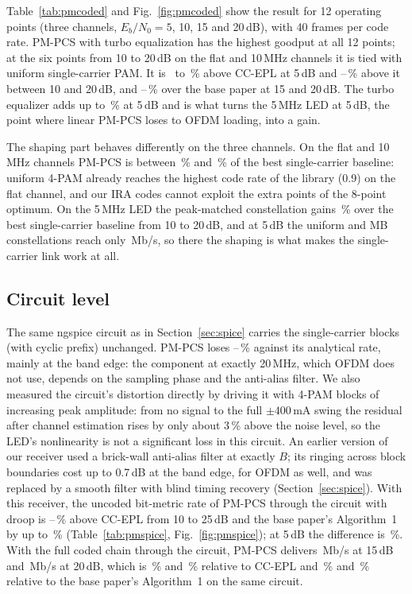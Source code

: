 \documentclass[conference]{IEEEtran}
\begin{document}
Table~\ref{tab:pmcoded} and Fig.~\ref{fig:pmcoded} show the result for 12 operating points (three channels, $E_b/N_0=5$, 10, 15 and 20\,dB), with 40 frames per code rate. PM-PCS with turbo equalization has the highest goodput at all 12 points; at the six points from 10 to 20\,dB on the flat and 10\,MHz channels it is tied with uniform single-carrier PAM. It is \PMcodedLowMin\ to \PMcodedLowMax\,\% above CC-EPL at 5\,dB and \PMcodedCCmin--\PMcodedCCmax\,\% above it between 10 and 20\,dB, and \PMcodedBaseMin--\PMcodedBaseMax\,\% over the base paper at 15 and 20\,dB. The turbo equalizer adds up to \PMturboFive\,\% at 5\,dB and is what turns the 5\,MHz LED at 5\,dB, the point where linear PM-PCS loses to OFDM loading, into a gain.

The shaping part behaves differently on the three channels. On the flat and 10\,MHz channels PM-PCS is between \PMcodedShapeMin\,\% and \PMcodedShapeMax\,\% of the best single-carrier baseline: uniform 4-PAM already reaches the highest code rate of the library (0.9) on the flat channel, and our IRA codes cannot exploit the extra points of the 8-point optimum. On the 5\,MHz LED the peak-matched constellation gains \PMcodedShapeFiveMin\,\% over the best single-carrier baseline from 10 to 20\,dB, and at 5\,dB the uniform and MB constellations reach only \PMcodedSCfive\,Mb/s, so there the shaping is what makes the single-carrier link work at all.



\subsection{Circuit level}
The same ngspice circuit as in Section~\ref{sec:spice} carries the single-carrier blocks (with cyclic prefix) unchanged. PM-PCS loses \PMspLossMin--\PMspLossMax\,\% against its analytical rate, mainly at the band edge: the component at exactly 20\,MHz, which OFDM does not use, depends on the sampling phase and the anti-alias filter. We also measured the circuit's distortion directly by driving it with 4-PAM blocks of increasing peak amplitude: from no signal to the full $\pm400$\,mA swing the residual after channel estimation rises by only about 3\,\% above the noise level, so the LED's nonlinearity is not a significant loss in this circuit. An earlier version of our receiver used a brick-wall anti-alias filter at exactly $B$; its ringing across block boundaries cost up to 0.7\,dB at the band edge, for OFDM as well, and was replaced by a smooth filter with blind timing recovery (Section~\ref{sec:spice}). With this receiver, the uncoded bit-metric rate of PM-PCS through the circuit with droop is \PMspCCmin--\PMspCCmax\,\% above CC-EPL from 10 to 25\,dB and the base paper's Algorithm~1 by up to \PMspBaseMax\,\% (Table~\ref{tab:pmspice}, Fig.~\ref{fig:pmspice}); at 5\,dB the difference is \PMspFive\,\%. With the full coded chain through the circuit, PM-PCS delivers \PMspCodedFifteen\,Mb/s at 15\,dB and \PMspCodedTwenty\,Mb/s at 20\,dB, which is \PMspCodedCCFifteen\,\% and \PMspCodedCCTwenty\,\% relative to CC-EPL and \PMspCodedBaseFifteen\,\% and \PMspCodedBaseTwenty\,\% relative to the base paper's Algorithm~1 on the same circuit.
\end{document}
